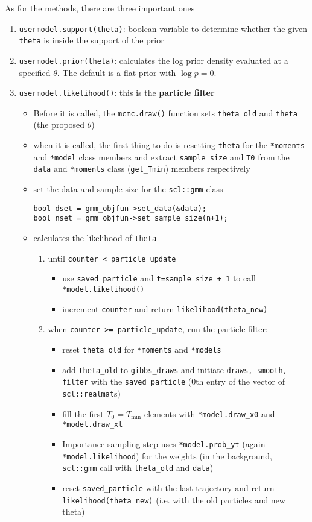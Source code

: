 \documentclass[11pt, letterpaper, notitlepage]{article}
\begin{document}
As for the methods, there are three important ones
\begin{enumerate}
\item \texttt{usermodel.support(\texttt{theta})}: boolean variable to determine whether the given \texttt{theta} is inside the support of the prior 
\item \texttt{usermodel.prior(\texttt{theta})}: calculates the log prior density evaluated at a specified $\theta$. The default is a flat prior with $\log p=0$.
\item \texttt{usermodel.likelihood()}: this is the \textbf{particle filter}
\begin{itemize}
\item Before it is called, the \texttt{mcmc.draw()} function sets \texttt{theta\_old} and \texttt{theta} (the proposed $\theta$) 
\item when it is called, the first thing to do is resetting \texttt{theta} for the \texttt{*moments} and \texttt{*model} class members and extract \texttt{sample\_size} and \texttt{T0} from the \texttt{data} and \texttt{*moments} class (\texttt{get\_Tmin}) members respectively
\item set the data and sample size for the \texttt{scl::gmm} class

	  \texttt{bool dset = gmm\_objfun->set\_data(\&data); \\       
      bool nset = gmm\_objfun->set\_sample\_size(n+1); }
\item calculates the likelihood of \texttt{theta}
\begin{enumerate}
\item until \texttt{counter < particle\_update}
\begin{itemize}
\item use \texttt{saved\_particle} and \texttt{t=sample\_size + 1} to call \texttt{*model.likelihood()}
\item increment \texttt{counter} and return \texttt{likelihood(theta\_new)}
\end{itemize}      
\item when \texttt{counter >= particle\_update}, run the particle filter:
\begin{itemize}
\item reset \texttt{theta\_old} for \texttt{*moments}  and \texttt{*models}
\item add \texttt{theta\_old} to \texttt{gibbs\_draws} and initiate \texttt{draws, smooth, filter} with the \texttt{saved\_particle} ($0$th entry of the vector of \texttt{scl::realmat}s)
\item fill the first $T_0=T_{\min}$ elements with \texttt{*model.draw\_x0} and \texttt{*model.draw\_xt}
\item Importance sampling step uses \texttt{*model.prob\_yt} (again \texttt{*model.likelihood}) for the weights (in the background, \texttt{scl::gmm} call with \texttt{theta\_old} and \texttt{data})
\item reset \texttt{saved\_particle} with the last trajectory and return \texttt{likelihood(theta\_new)} (i.e. with the old particles and new theta)
\end{itemize}
\end{enumerate}


\end{itemize}
\end{enumerate}
\end{document}
